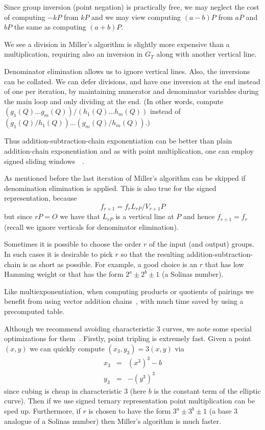 Since group inversion (point negation) is practically free,
we may neglect the cost of computing $-kP$ from $kP$ and we may view
computing $(a-b)P$ from $aP$ and $bP$ the same as computing
$(a+b)P$.

We see a division in Miller's algorithm is slightly more expensive than
a multiplication, requiring also an inversion in $G_T$ along with
another vertical line.

Denominator elimination allows us to ignore vertical lines.
Also, the inversions can be collated. We can defer divisions,
and have one inversion at the end instead of one per iteration,
by maintaining numerator and denominator variables during the main loop
and only dividing at the end.
(In other words, compute $(g_1(Q) ... g_m(Q)) / (h_1(Q) ... h_m(Q))$
instead of $(g_1(Q) / h_1(Q)) ... (g_m(Q) / h_m(Q))$.)

Thus addition-subtraction-chain exponentiation can be
better than plain addition-chain exponentiation and as with
point multiplication, one can employ signed sliding
windows~\cite[Chapter 14]{handbook}~\cite[Section IV.2.5]{bss}.

As mentioned before the last iteration of Miller's algorithm can be skipped
if denomination elimination is applied.
This is also true for the signed representation, because
\[
f_{r+1} = f_r L_{rP} / V_{r+1}P
\]
but since $rP = O$
we have that $L_{rP}$ is a vertical line at $P$ and hence $f_{r+1} = f_r$
(recall we ignore verticals for denominator elimination).

Sometimes it is possible to choose the order $r$ of the input (and output)
groups. In such cases it is desirable to pick $r$ so that the resulting
addition-subtraction-chain is as short as possible. For example,
a good choice is an $r$ that has low Hamming weight or that has the form
$2^a \pm 2^b \pm 1$ (a Solinas number).

Like multiexponentiation,
when computing products or quotients of pairings we
benefit from using vector addition chains~\cite[Chapter 14]{handbook},
with much time saved by using a precomputed table.

Although we recommend avoiding characteristic 3 curves,
we note some special optimizations for them~\cite{bakls}.
Firstly, point tripling is extremely fast.
Given a point $(x,y)$ we can quickly
compute $(x_3,y_3) = 3(x,y)$ via
\[
\begin{array}{lcl}
x_3 &=& (x^3)^3 - b \\
y_3 &=& -(y^3)^3
\end{array}
\]
since cubing is cheap in characteristic 3
(here $b$ is the constant term of the elliptic curve).
Then if we use signed ternary representation point multiplication can be
sped up. Furthermore, if $r$ is chosen to have the form
$3^a \pm 3^b \pm 1$ (a base 3 analogue of a Solinas number) then Miller's
algorithm is much faster.
